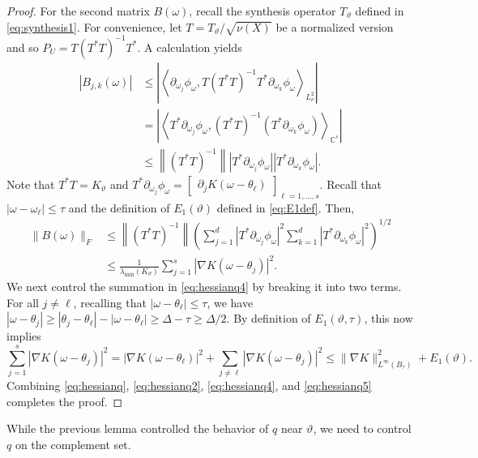 \documentclass[11pt]{article}
\theoremstyle{definition}
\numberwithin{theorem}{section}
\numberwithin{lemma}{section}
\numberwithin{equation}{section}
\def\C{\mathbb{C}}
\newcommand{\sampset}{X}
\newcommand{\norm}[1]{{\left\|#1\right\|}}
\newcommand{\inner}[1]{{\left\langle#1\right\rangle}}
\numberwithin{equation}{section}
\begin{document}
\begin{proof}
	For the second matrix $B(\omega)$, recall the synthesis operator $T_\vartheta$ defined in \eqref{eq:synthesis1}. For convenience, let $T=T_\vartheta/\sqrt{\nu(\sampset)}$ be a normalized version and so
	$
	P_U=T (T^*T)^{-1} T^*$. A calculation yields
	\begin{align*}
		|B_{j,k}(\omega)|
		&\leq \left|\inner{\partial_{\omega_j} \phi_\omega, T (T^*T)^{-1} T^*\partial_{\omega_k}\phi_\omega}_{L^2_\nu}\right| \\
		&=\left|\inner{T^*\partial_{\omega_j} \phi_\omega, (T^*T)^{-1} (T^*\partial_{\omega_k} \phi_\omega)}_{\C^s}\right| \\
		&\leq \norm{ (T^*T)^{-1}} |T^*\partial_{\omega_j} \phi_\omega| |T^*\partial_{\omega_k} \phi_\omega|.
	\end{align*}
	Note that $T^*T = K_\vartheta$ and $T^* \partial_{\omega_j} \phi_\omega
	= \begin{bmatrix}
		\partial_j K(\omega-\theta_\ell)
	\end{bmatrix}_{\ell=1,\dots,s}
	$. Recall that $|\omega-\omega_\ell|\leq \tau$ and the definition of $E_1(\vartheta)$ defined in \eqref{eq:E1def}. Then,
	\begin{equation}
		\begin{split}
			\|B(\omega)\|_F
			&\leq \norm{ (T^*T)^{-1}} \left(\sum_{j=1}^d |T^*\partial_{\omega_j} \phi_\omega|^2 \sum_{k=1}^d |T^*\partial_{\omega_k} \phi_\omega|^2\right)^{1/2} \\
			&\leq \frac{1}{\lambda_{\min}(K_\vartheta)} \sum_{j=1}^s |\nabla K(\omega-\theta_j)|^2.
		\end{split}
		\label{eq:hessianq4}
	\end{equation}	
	We next control the summation in \eqref{eq:hessianq4} by breaking it into two terms. For all $j\ne \ell$, recalling that $|\omega-\theta_\ell|\leq \tau$, we have 
	$
	|\omega-\theta_j|
	\geq |\theta_j-\theta_\ell| - |\omega-\theta_\ell|
	\geq \Delta-\tau\geq \Delta/2. 
	$
	By definition of $E_1(\vartheta,\tau)$, this now implies 
	\begin{equation}
		\sum_{j=1}^s |\nabla K(\omega-\theta_j)|^2
		=|\nabla K(\omega-\theta_\ell)|^2 + \sum_{j\ne\ell} |\nabla K(\omega-\theta_j)|^2
		\leq \|\nabla K\|_{L^\infty(B_\tau)}^2 + E_1(\vartheta). \label{eq:hessianq5}
	\end{equation}
	Combining \eqref{eq:hessianq}, \eqref{eq:hessianq2}, \eqref{eq:hessianq4}, and \eqref{eq:hessianq5} completes the proof.
	\end{proof}
	
	While the previous lemma controlled the behavior of $q$ near $\vartheta$, we need to control $q$ on the complement set. 
	
\end{document}
